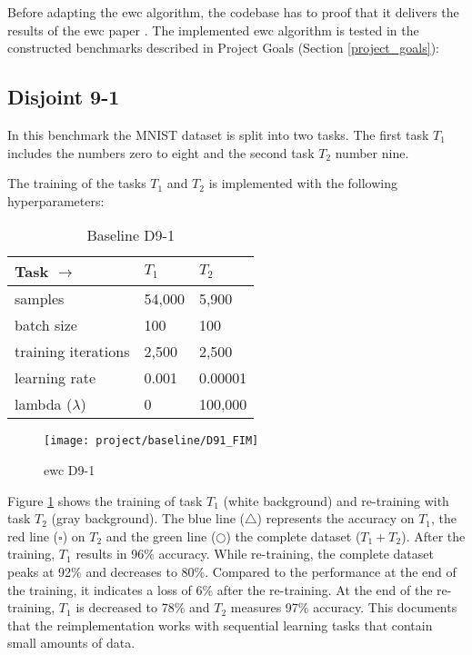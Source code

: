 Before adapting the \acrshort{ewc} algorithm, the codebase has to proof that it delivers the results of the \acrshort{ewc} paper \cite{elastic-weight-consolidation}.
The implemented \acrshort{ewc} algorithm is tested in the constructed benchmarks described in Project Goals (Section \ref{project_goals}):

\subsection{Disjoint 9-1}

In this benchmark the MNIST dataset is split into two tasks.
The first task $T_1$ includes the numbers zero to eight and the second task $T_2$ number nine.

The training of the tasks $T_1$ and $T_2$ is implemented with the following hyperparameters:

\begin{table}[H]
    \centering
    \begin{tabular}{ |l|l|l|  }
        \hline
        Task $\to$ & $T_1$ & $T_2$ \\
        \hline\hline
        samples & 54,000 & 5,900 \\
        \hline
        batch size & 100 & 100 \\
        \hline
        training iterations & 2,500 & 2,500 \\
        \hline
        learning rate & 0.001 & 0.00001 \\
        \hline
        lambda ($\lambda$) & 0 & 100,000 \\
        \hline
    \end{tabular}
    \caption{Baseline D9-1}
    \label{table:base_d91}
\end{table}

\begin{figure}[H]
    \centering
    \texttt{[image: project/baseline/D91\_FIM]}
    \caption{\acrshort{ewc} D9-1}
    \label{fig:ewc_d9-1}
\end{figure}

Figure \ref{fig:ewc_d9-1} shows the training of task $T_1$ (white background) and re-training with task $T_2$ (gray background).
The blue line ($\triangle$) represents the accuracy on $T_1$, the red line ($\square$) on $T_2$ and the green line ($\bigcirc$) the complete dataset ($T_1 + T_2$).
After the training, $T_1$ results in 96\% accuracy.
While re-training, the complete dataset peaks at 92\% and decreases to 80\%.
Compared to the performance at the end of the training, it indicates a loss of 6\% after the re-training.
At the end of the re-training, $T_1$ is decreased to 78\% and $T_2$ measures 97\% accuracy.
\newline
This documents that the reimplementation works with sequential learning tasks that contain small amounts of data.

